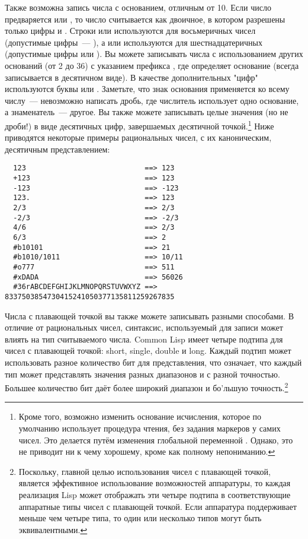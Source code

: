 Также возможна запись числа с основанием, отличным от 10.  Если число предваряется
 или , то число считывается как двоичное, в котором разрешены только
цифры  и .  Строки  или  используются для восьмеричных
чисел (допустимые цифры~--- ), а  или  используются для
шестнадцатеричных (допустимые цифры  или ).  Вы можете записывать
числа с использованием других оснований (от 2 до 36) с указанием префикса , где
 определяет основание (всегда записывается в десятичном виде).  В качестве
дополнительных "цифр" используются буквы  или .  Заметьте, что знак
основания применяется ко всему числу~--- невозможно написать дробь, где числитель
использует одно основание, а знаменатель~--- другое.  Вы также можете записывать целые
значения (но не дроби!) в виде десятичных цифр, завершаемых десятичной
точкой.\footnote{Кроме того, возможно изменить основание исчисления, которое по умолчанию
  использует процедура чтения, без задания маркеров у самих чисел. Это делается путём
  изменения глобальной переменной .  Однако, это не приводит ни к чему
  хорошему, кроме как полному непониманию.}  Ниже приводятся некоторые примеры
рациональных чисел, с их каноническим, десятичным представлением:

\begin{verbatim}
  123                            ==> 123
  +123                           ==> 123
  -123                           ==> -123
  123.                           ==> 123
  2/3                            ==> 2/3
  -2/3                           ==> -2/3
  4/6                            ==> 2/3
  6/3                            ==> 2
  #b10101                        ==> 21
  #b1010/1011                    ==> 10/11
  #o777                          ==> 511
  #xDADA                         ==> 56026
  #36rABCDEFGHIJKLMNOPQRSTUVWXYZ ==> 8337503854730415241050377135811259267835
\end{verbatim}

Числа с плавающей точкой вы также можете записывать разными способами.  В отличие от
рациональных чисел, синтаксис, используемый для записи может влиять на тип считываемого
числа.  Common Lisp имеет четыре подтипа для чисел с плавающей точкой: short, single,
double и long.  Каждый подтип может использовать разное количество бит для представления,
что означает, что каждый тип может представлять значения разных диапазонов и с разной
точностью.  Большее количество бит даёт более широкий диапазон и бо'льшую
точность.\footnote{Поскольку, главной целью использования чисел с плавающей точкой,
  является эффективное использование возможностей аппаратуры, то каждая реализация Lisp
  может отображать эти четыре подтипа в соответствующие аппаратные типы чисел с плавающей
  точкой.  Если аппаратура поддерживает меньше чем четыре типа, то один или несколько
  типов могут быть эквивалентными.}

